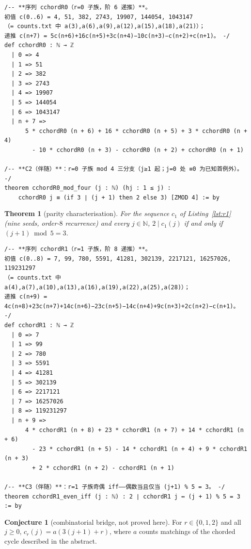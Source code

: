 \documentclass[11pt]{article}
\newtheorem{theorem}{Theorem}
\theoremstyle{definition}
\newtheorem{conjecture}{Conjecture}
\begin{document}
\begin{lstlisting}[caption={Frozen formal statement, verbatim lines 45--63 of
\texttt{formalized/01-cchord-mods.lean}.},label={lst:r0}]
/-- **序列 cchordR0（r=0 子族，阶 6 递推）**。
初值 c(0..6) = 4, 51, 382, 2743, 19907, 144054, 1043147
（= counts.txt 中 a(3),a(6),a(9),a(12),a(15),a(18),a(21)）；
递推 c(n+7) = 5c(n+6)+16c(n+5)+3c(n+4)−10c(n+3)−c(n+2)+c(n+1)。 -/
def cchordR0 : ℕ → ℤ
  | 0 => 4
  | 1 => 51
  | 2 => 382
  | 3 => 2743
  | 4 => 19907
  | 5 => 144054
  | 6 => 1043147
  | n + 7 =>
      5 * cchordR0 (n + 6) + 16 * cchordR0 (n + 5) + 3 * cchordR0 (n + 4)
        - 10 * cchordR0 (n + 3) - cchordR0 (n + 2) + cchordR0 (n + 1)

/-- **C2（伴随）**：r=0 子族 mod 4 三分支（j≥1 起；j=0 处 ≡0 为已知首例外）。 -/
theorem cchordR0_mod_four (j : ℕ) (hj : 1 ≤ j) :
    cchordR0 j ≡ (if 3 ∣ (j + 1) then 2 else 3) [ZMOD 4] := by
\end{lstlisting}

\begin{theorem}[parity characterisation]\label{thm:r1}
For the sequence $c_1$ of Listing~\ref{lst:r1} (nine seeds, order-$8$
recurrence) and every $j\in\mathbb{N}$,
$2\mid c_1(j)$ if and only if $(j+1)\bmod 5=3$.
\end{theorem}

\begin{lstlisting}[caption={Frozen formal statement, verbatim lines 66--86 of
\texttt{formalized/01-cchord-mods.lean}.},label={lst:r1}]
/-- **序列 cchordR1（r=1 子族，阶 8 递推）**。
初值 c(0..8) = 7, 99, 780, 5591, 41281, 302139, 2217121, 16257026, 119231297
（= counts.txt 中 a(4),a(7),a(10),a(13),a(16),a(19),a(22),a(25),a(28)）；
递推 c(n+9) = 4c(n+8)+23c(n+7)+14c(n+6)−23c(n+5)−14c(n+4)+9c(n+3)+2c(n+2)−c(n+1)。 -/
def cchordR1 : ℕ → ℤ
  | 0 => 7
  | 1 => 99
  | 2 => 780
  | 3 => 5591
  | 4 => 41281
  | 5 => 302139
  | 6 => 2217121
  | 7 => 16257026
  | 8 => 119231297
  | n + 9 =>
      4 * cchordR1 (n + 8) + 23 * cchordR1 (n + 7) + 14 * cchordR1 (n + 6)
        - 23 * cchordR1 (n + 5) - 14 * cchordR1 (n + 4) + 9 * cchordR1 (n + 3)
        + 2 * cchordR1 (n + 2) - cchordR1 (n + 1)

/-- **C3（伴随）**：r=1 子族奇偶 iff——偶数当且仅当 (j+1) % 5 = 3。 -/
theorem cchordR1_even_iff (j : ℕ) : 2 ∣ cchordR1 j ↔ (j + 1) % 5 = 3 := by
\end{lstlisting}

\begin{conjecture}[combinatorial bridge, not proved here]\label{conj:bridge}
For $r\in\{0,1,2\}$ and all $j\ge 0$, $c_r(j)=a(3(j+1)+r)$, where $a$ counts
matchings of the chorded cycle described in the abstract.
\end{conjecture}
\end{document}

